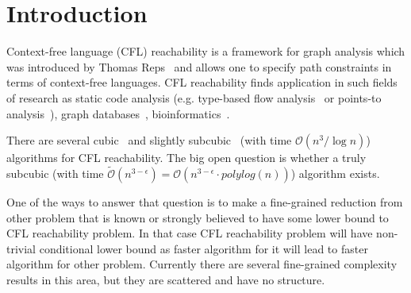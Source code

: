 \documentclass[acmsmall,nonacm]{acmart}
\begin{document}
		
	
	
	\maketitle
	
	\section{Introduction}

	Context-free language (CFL) reachability is a framework for graph analysis which was introduced by Thomas Reps~\cite{REPS1998701} and allows one to specify path constraints in terms of context-free languages. CFL reachability finds application in such fields of research as static code analysis (e.g. type-based flow analysis~\cite{10.1145/373243.360208} or points-to analysis~\cite{10.1145/1103845.1094817, 10.1145/1133255.1134027}), graph databases~\cite{10.1145/298514.298576}, bioinformatics~\cite{SubgraphQueriesbyContextfreeGrammars}.

	There are several cubic~\cite{10.1145/298514.298576, 10.1145/199448.199462} and slightly subcubic~\cite{10.1145/1328438.1328460} (with time $\mathcal{O}(n^{3} / \log n)$) algorithms for CFL reachability. The big open question is whether a truly subcubic (with time $\tilde{\mathcal{O}}(n^{3 - \epsilon}) = \mathcal{O}(n^{3 - \epsilon} \cdot polylog(n))$) algorithm exists. 

	One of the ways to answer that question is to make a fine-grained reduction from other problem that is known or strongly believed to have some lower bound to CFL reachability problem. In that case CFL reachability problem will have non-trivial conditional lower bound as faster algorithm for it will lead to faster algorithm for other problem. Currently there are several fine-grained complexity results in this area, but they are scattered and have no structure.
\end{document}
